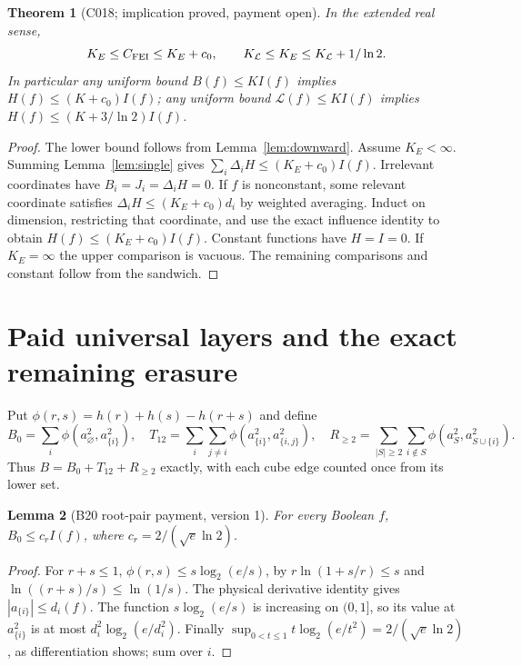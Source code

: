 \documentclass[11pt]{article}
\newtheorem{lemma}{Lemma}
\newtheorem{theorem}[lemma]{Theorem}
\begin{document}
\begin{theorem}[C018; implication proved, payment open]
\label{thm:erasure}
In the extended real sense,
\[
K_E\le C_{\rm FEI}\le K_E+c_0,\qquad
K_{\mathcal L}\le K_E\le K_{\mathcal L}+1/\ln2.
\]
In particular any uniform bound $B(f)\le KI(f)$ implies
$H(f)\le(K+c_0)I(f)$; any uniform bound
$\mathcal L(f)\le KI(f)$ implies
$H(f)\le(K+3/\ln2)I(f)$.
\end{theorem}
\begin{proof}
The lower bound follows from Lemma~\ref{lem:downward}.
Assume $K_E<\infty$. Summing Lemma~\ref{lem:single} gives
$\sum_i\Delta_iH\le(K_E+c_0)I(f)$.
Irrelevant coordinates have $B_i=J_i=\Delta_iH=0$.
If $f$ is nonconstant, some relevant coordinate satisfies
$\Delta_iH\le(K_E+c_0)d_i$ by weighted averaging.
Induct on dimension, restricting that coordinate, and use the exact
influence identity to obtain $H(f)\le(K_E+c_0)I(f)$.
Constant functions have $H=I=0$. If $K_E=\infty$ the upper
comparison is vacuous. The remaining comparisons and constant follow
from the sandwich.
\end{proof}

\section{Paid universal layers and the exact remaining erasure}
Put $\phi(r,s)=h(r)+h(s)-h(r+s)$ and define
\[
B_0=\sum_i\phi(a_\varnothing^2,a_{\{i\}}^2),\quad
T_{12}=\sum_i\sum_{j\ne i}\phi(a_{\{i\}}^2,a_{\{i,j\}}^2),\quad
R_{\ge2}=\sum_{|S|\ge2}\sum_{i\notin S}\phi(a_S^2,a_{S\cup\{i\}}^2).
\]
Thus $B=B_0+T_{12}+R_{\ge2}$ exactly, with each cube edge
counted once from its lower set.
\begin{lemma}[B20 root-pair payment, version 1]
\label{lem:root}
For every Boolean $f$, $B_0\le c_r I(f)$, where
$c_r=2/(\sqrt e\ln2)$.
\end{lemma}
\begin{proof}
For $r+s\le1$, $\phi(r,s)\le s\log_2(e/s)$, by
$r\ln(1+s/r)\le s$ and $\ln((r+s)/s)\le\ln(1/s)$.
The physical derivative identity gives $|a_{\{i\}}|\le d_i(f)$.
The function $s\log_2(e/s)$ is increasing on $(0,1]$, so its
value at $a_{\{i\}}^2$ is at most $d_i^2\log_2(e/d_i^2)$.
Finally $\sup_{0<t\le1}t\log_2(e/t^2)=2/(\sqrt e\ln2)$,
as differentiation shows; sum over $i$.
\end{proof}
\end{document}
